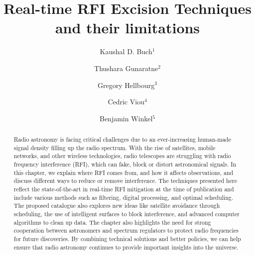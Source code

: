 \documentclass{iau_FM}
\title[chapter:hardware] {Real-time RFI Excision Techniques and their limitations}
\author[Buch, Gunaratne, Hellbourg, Viou and Winkel]   %
{
 Kaushal D. Buch$^1$
 \and Thushara Gunaratne$^2$
 \and Gregory Hellbourg$^3$
 \and Cedric Viou$^4$
 \and Benjamin Winkel$^5$
}
\affiliation{
$^1$ Giant Metrewave Radio Telescope, NCRA-TIFR, Pune, India \\ email: {\tt kdbuch@gmrt.ncra.tifr.res.in}\\[\affilskip]
$^2$ Herzberg Astronomy and Astrophysics Research Center, National Research Council Canada \\ email: {\tt Thushara.Gunaratne@nrc-cnrc.gc.ca} \\[\affilskip]
$^3$ California Institute of Technology, Pasadena, CA, USA \\ email: {\tt ghellbourg@astro.caltech.edu}\\[\affilskip]
$^4$ Observatoire Radioastronomique de Nançay (ORN), Observatoire de Paris, Université PSL, Université d'Orléans, CNRS, Nançay, France \\ email: {\tt Cedric.Viou@obs-nancay.fr} \\[\affilskip]
$^5$ Max-Planck-Institut für Radioastronomie - Effelsberg radio observatory \\ email: {\tt bwinkel@mpifr-bonn.mpg.de} \\[\affilskip]
}
\begin{document}
\maketitle

\begin{abstract}
Radio astronomy is facing critical challenges due to an ever-increasing human-made signal density filling up the radio spectrum. With the rise of satellites, mobile networks, and other wireless technologies, radio telescopes are struggling with radio frequency interference (RFI), which can fake, block or distort astronomical signals. In this chapter, we explain where RFI comes from, and how it affects observations, and discuss different ways to reduce or remove interference. The techniques presented here reflect the state-of-the-art in real-time RFI mitigation at the time of publication and include various methods such as filtering, digital processing, and optimal scheduling. The proposed catalogue also explores new ideas like satellite avoidance through scheduling, the use of intelligent surfaces to block interference, and advanced computer algorithms to clean up data. The chapter also highlights the need for strong cooperation between astronomers and spectrum regulators to protect radio frequencies for future discoveries. By combining technical solutions and better policies, we can help ensure that radio astronomy continues to provide important insights into the universe.
\end{abstract}












%

\end{document}
